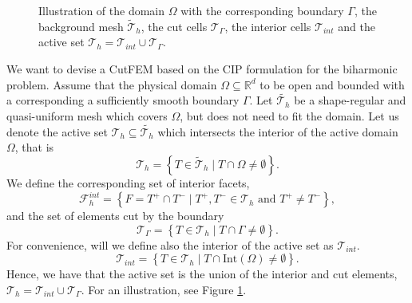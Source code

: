 \begin{figure}[h!]
{


}


\caption{Illustration of the domain $\Omega$ with the corresponding boundary $\Gamma$, the background mesh $\widetilde{\mathcal{T}}_{h} $,  the cut cells $\mathcal{T} _{\Gamma }$, the interior cells $\mathcal{T} _{int}$ and the active set $\mathcal{T} _{h} =
\mathcal{T}_{ int } \cup \mathcal{T}_{ \Gamma  }  $. }
\label{fig:background_mesh}
\end{figure}


We want to devise a CutFEM based on the CIP formulation for the biharmonic problem. Assume that the physical domain $\Omega \subseteq    \mathbb{R} ^d$ to be open and bounded with a corresponding a sufficiently smooth boundary $\Gamma  $.
 Let $\widetilde{\mathcal{T}_{h} } $ be a shape-regular and quasi-uniform mesh which covers $\Omega $, but does not need to fit the
domain. Let us denote the active set $\mathcal{T} _{h} \subseteq \widetilde{\mathcal{T}_{h}}$ which intersects the interior of the active domain $\Omega $, that is
\begin{equation}
\label{eq:active_set}
\mathcal{T} _{h} = \left\{ T \in \widetilde{\mathcal{T} }_{h}  \mid  T \cap \Omega   \neq \emptyset    \right\}.
\end{equation}
We define the corresponding set of interior facets, \[
    \mathcal{F} _{h}^{int} = \left\{ F = T^{+} \cap T^{-}  \mid  T^{+}, T^{-} \in \mathcal{T} _{h} \text{ and } T^{+} \neq T^{-} \right\},
\]
and the set of elements cut by the boundary \[
\mathcal{T} _{\Gamma } = \left\{ T \in \mathcal{T} _{h}   \mid  T \cap \Gamma \neq \emptyset  \right\}.
\]
For convenience, will we define also the interior of the active set as $\mathcal{T} _{int}$.
\[
\mathcal{T} _{int} = \left\{ T \in \mathcal{T} _{h}   \mid  T \cap  \mathrm{Int}(\Omega ) \neq \emptyset  \right\}.
\]
Hence, we have that the active set is the union of the interior and cut elements, $\mathcal{T} _{h} = \mathcal{T} _{int} \cup  \mathcal{T} _{\Gamma }$. For an illustration, see Figure \ref{fig:background_mesh}.



